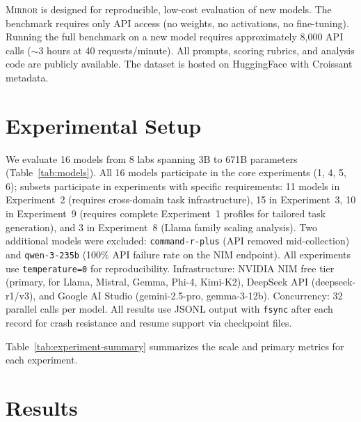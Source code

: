 \documentclass[10pt]{article}
\newcommand{\mirror}{\textsc{Mirror}}
\begin{document}
\mirror{} is designed for reproducible, low-cost evaluation of new models. The
benchmark requires only API access (no weights, no activations, no fine-tuning).
Running the full benchmark on a new model requires approximately 8,000 API calls
($\sim$3 hours at 40 requests/minute). All prompts, scoring rubrics, and analysis
code are publicly available. The dataset is hosted on HuggingFace with Croissant
metadata.

\section{Experimental Setup}
\label{sec:setup}



We evaluate 16 models from 8 labs spanning 3B to 671B parameters
(Table~\ref{tab:models}). All 16 models participate in the core experiments (1, 4, 5, 6); subsets participate in experiments with specific requirements: 11 models in Experiment~2 (requires cross-domain task infrastructure), 15 in Experiment~3, 10 in Experiment~9 (requires complete Experiment~1 profiles for tailored task generation), and 3 in Experiment~8 (Llama family scaling analysis). Two additional models were excluded:
\texttt{command-r-plus} (API removed mid-collection) and \texttt{qwen-3-235b}
(100\% API failure rate on the NIM endpoint). All experiments use
\texttt{temperature=0} for reproducibility. Infrastructure: NVIDIA NIM free tier
(primary, for Llama, Mistral, Gemma, Phi-4, Kimi-K2), DeepSeek API
(deepseek-r1/v3), and Google AI Studio (gemini-2.5-pro, gemma-3-12b).
Concurrency: 32 parallel calls per model. All results use JSONL output with
\texttt{fsync} after each record for crash resistance and resume support via
checkpoint files.

Table~\ref{tab:experiment-summary} summarizes the scale and primary metrics for
each experiment.



\section{Results}
\label{sec:results}
\end{document}
